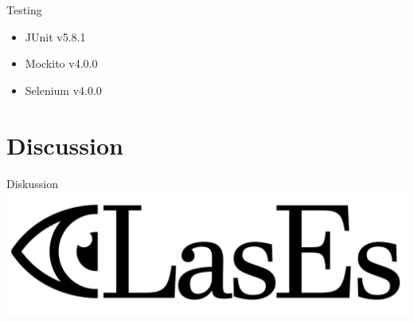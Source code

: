 \documentclass{beamer}
\begin{document}
    \begin{frame}{Testing}
        \begin{itemize}
            \item JUnit v5.8.1
            \item Mockito v4.0.0
            \item Selenium v4.0.0
        \end{itemize}
    \end{frame}


    \section{Discussion}
    \begin{frame}{Diskussion}
        \centering
        \includegraphics[width=0.7\linewidth]{../../docs/Pflichtenheft/graphics/LasEs-logo}
    \end{frame}
\end{document}
